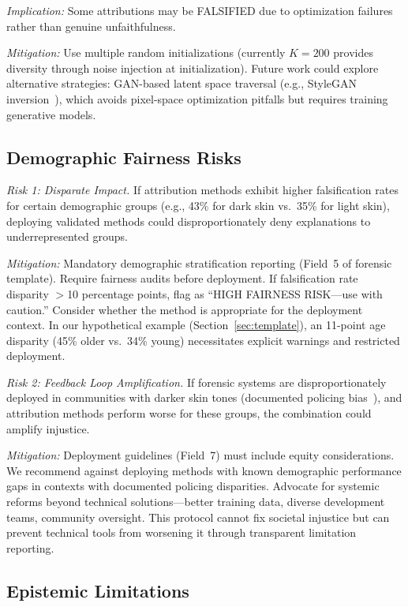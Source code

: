 \textit{Implication:} Some attributions may be FALSIFIED due to optimization failures rather than genuine unfaithfulness.

\textit{Mitigation:} Use multiple random initializations (currently $K=200$ provides diversity through noise injection at initialization). Future work could explore alternative strategies: GAN-based latent space traversal (e.g., StyleGAN inversion~\cite{abdal2019image2stylegan}), which avoids pixel-space optimization pitfalls but requires training generative models.

\subsection{Demographic Fairness Risks}

\textit{Risk 1: Disparate Impact.} If attribution methods exhibit higher falsification rates for certain demographic groups (e.g., 43\% for dark skin vs.\ 35\% for light skin), deploying validated methods could disproportionately deny explanations to underrepresented groups.

\textit{Mitigation:} Mandatory demographic stratification reporting (Field~5 of forensic template). Require fairness audits before deployment. If falsification rate disparity $>$10 percentage points, flag as ``HIGH FAIRNESS RISK—use with caution.'' Consider whether the method is appropriate for the deployment context. In our hypothetical example (Section~\ref{sec:template}), an 11-point age disparity (45\% older vs.\ 34\% young) necessitates explicit warnings and restricted deployment.

\textit{Risk 2: Feedback Loop Amplification.} If forensic systems are disproportionately deployed in communities with darker skin tones (documented policing bias~\cite{buolamwini2018gender}), and attribution methods perform worse for these groups, the combination could amplify injustice.

\textit{Mitigation:} Deployment guidelines (Field~7) must include equity considerations. We recommend against deploying methods with known demographic performance gaps in contexts with documented policing disparities. Advocate for systemic reforms beyond technical solutions—better training data, diverse development teams, community oversight. This protocol cannot fix societal injustice but can prevent technical tools from worsening it through transparent limitation reporting.

\subsection{Epistemic Limitations}

